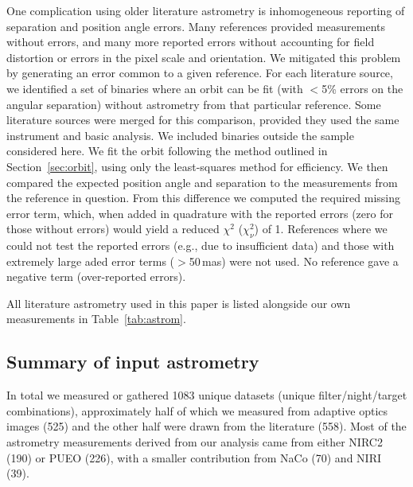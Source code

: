 \documentclass[twocolumn]{aastex62}
\begin{document}
One complication using older literature astrometry is inhomogeneous reporting of separation and position angle errors. Many references provided measurements without errors, and many more reported errors without accounting for field distortion or errors in the pixel scale and orientation. We mitigated this problem by generating an error common to a given reference. For each literature source, we identified a set of binaries where an orbit can be fit (with $<$5\% errors on the angular separation) without astrometry from that particular reference. Some literature sources were merged for this comparison, provided they used the same instrument and basic analysis. We included binaries outside the sample considered here. We fit the orbit following the method outlined in Section~\ref{sec:orbit}, using only the least-squares method for efficiency. We then compared the expected position angle and separation to the measurements from the reference in question. From this difference we computed the required missing error term, which, when added in quadrature with the reported errors (zero for those without errors) would yield a reduced $\chi^2$ ($\chi^2_\nu$) of 1. References where we could not test the reported errors (e.g., due to insufficient data) and those with extremely large aded error terms ($>$50\,mas) were not used. No reference gave a negative term (over-reported errors). 

All literature astrometry used in this paper is listed alongside our own measurements in Table~\ref{tab:astrom}. 

\subsection{Summary of input astrometry}

In total we measured or gathered 1083 unique datasets (unique filter/night/target combinations), approximately half of which we measured from adaptive optics images (525) and the other half were drawn from the literature (558). Most of the astrometry measurements derived from our analysis came from either NIRC2 (190) or PUEO (226), with a smaller contribution from NaCo (70) and NIRI (39). 
\end{document}
